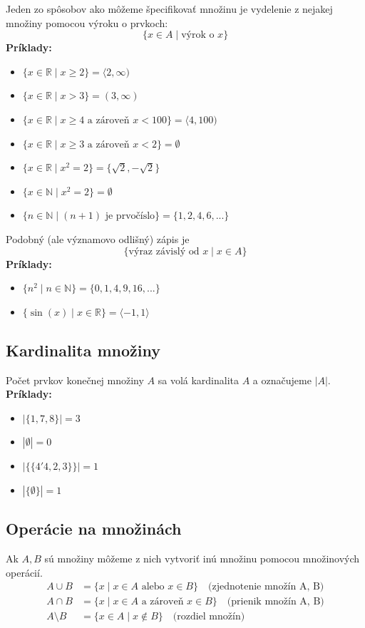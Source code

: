 Jeden zo spôsobov ako môžeme špecifikovať množinu je vydelenie z nejakej množiny pomocou výroku o prvkoch:
$$ \{x \in A \mid \text{výrok o } x\} $$
\textbf{Príklady:}
\begin{itemize}
    \item $\{x \in \mathbb{R} \mid x \ge 2\} = \langle 2, \infty)$
    \item $\{x \in \mathbb{R} \mid x > 3\} = (3, \infty)$
    \item $\{x \in \mathbb{R} \mid x \ge 4 \text{ a zároveň } x < 100\} = \langle 4, 100)$
    \item $\{x \in \mathbb{R} \mid x \ge 3 \text{ a zároveň } x < 2\} = \emptyset$
    \item $\{x \in \mathbb{R} \mid x^2 = 2\} = \{\sqrt{2}, -\sqrt{2}\}$
    \item $\{x \in \mathbb{N} \mid x^2 = 2\} = \emptyset$
    \item $\{n \in \mathbb{N} \mid (n+1) \text{ je prvočíslo}\} = \{1, 2, 4, 6, ...\}$
\end{itemize}

Podobný (ale významovo odlišný) zápis je
$$ \{ \text{výraz závislý od } x \mid x \in A \} $$
\textbf{Príklady:}
\begin{itemize}
    \item $\{n^2 \mid n \in \mathbb{N}\} = \{0, 1, 4, 9, 16, ...\}$
    \item $\{\sin(x) \mid x \in \mathbb{R}\} = \langle -1, 1 \rangle$
\end{itemize}

\subsection{Kardinalita množiny}
Počet prvkov konečnej množiny $A$ sa volá kardinalita $A$ a označujeme $|A|$.
\noindent\textbf{Príklady:}
\begin{itemize}
    \item $|\{1,7,8\}|=3$
    \item $|\emptyset|=0$
    \item $|\{\{4'4,2,3\}\}|= 1$
    \item $|\{\emptyset\}|=1$
\end{itemize}

\subsection{Operácie na množinách}
Ak $A, B$ sú množiny môžeme z nich vytvoriť inú množinu pomocou množinových operácií.
\begin{align*}
    A \cup B &= \{x \mid x \in A \text{ alebo } x \in B\} \quad \text{(zjednotenie množín A, B)} \\
    A \cap B &= \{x \mid x \in A \text{ a zároveň } x \in B\} \quad \text{(prienik množín A, B)} \\
    A \setminus B &= \{x \in A \mid x \notin B\} \quad \text{(rozdiel množín)}
\end{align*}

